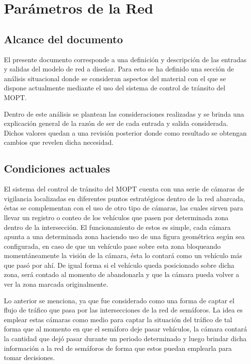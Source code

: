\section{Par\'{a}metros de la Red}

\subsection{Alcance del documento}

El presente documento corresponde a una definici\'{o}n y descripci\'{o}n de las entradas y salidas del modelo de red a dise\'{n}ar. Para esto se ha definido una secci\'{o}n de an\'{a}lisis situacional donde se consideran aspectos del material con el que se dispone actualmente mediante el uso del sistema de control de tr\'{a}nsito del MOPT.

Dentro de este an\'{a}lisis se plantean las consideraciones realizadas y se brinda una explicaci\'{o}n general de la raz\'{o}n de ser de cada entrada y salida considerada. Dichos valores quedan a una revisi\'{o}n posterior donde como resultado se obtengan cambios que revelen dicha necesidad.

\subsection{Condiciones actuales}

El sistema del control de tr\'{a}nsito del MOPT cuenta con una serie de c\'{a}maras de vigilancia localizadas en diferentes puntos estrat\'{e}gicos dentro de la red abarcada, \'{e}stas se complementan con el uso de otro tipo de c\'{a}maras, las cuales sirven para llevar un registro o conteo de los veh\'{i}culos que pasen por determinada zona dentro de la intersecci\'{o}n. El funcionamiento de estos es simple, cada c\'{a}mara apunta a una determinada zona haciendo uso de una figura geom\'{e}trica seg\'{u}n sea configurada, en caso de que un veh\'{i}culo pase sobre esta zona bloqueando moment\'{a}neamente la visi\'{o}n de la c\'{a}mara, \'{e}sta lo contar\'{a} como un veh\'{i}culo m\'{a}s que pas\'{o} por ah\'{i}. De igual forma si el veh\'{i}culo queda posicionado sobre dicha zona, ser\'{a} contado al momento de abandonarla y que la c\'{a}mara pueda volver a ver la zona marcada originalmente.

Lo anterior se menciona, ya que fue considerado como una forma de captar el flujo de tr\'{a}fico que pasa por las intersecciones de la red de sem\'{a}foros. La idea es emplear estas c\'{a}maras como medio para captar la situaci\'{o}n del tr\'{a}fico de tal forma que al momento en que el sem\'{a}foro deje pasar veh\'{i}culos, la c\'{a}mara contar\'{a} la cantidad que dej\'{o} pasar durante un periodo determinado y luego brindar dicha informaci\'{o}n a la red de sem\'{a}foros de forma que estos puedan emplearla para tomar decisiones.

